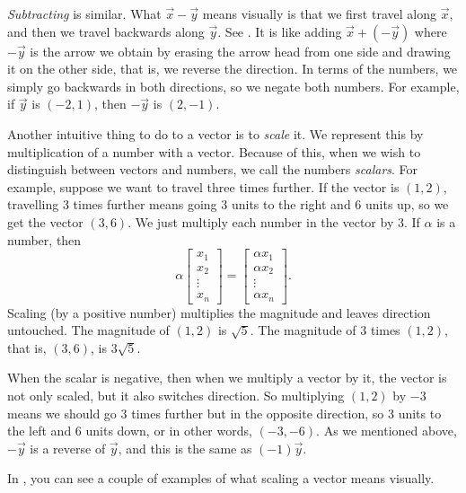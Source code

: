 \emph{Subtracting} is similar.
What $\vec{x}- \vec{y}$ means visually is that
we first travel along $\vec{x}$, and then we travel
backwards along $\vec{y}$.
See .
It is like adding
$\vec{x}+ (- \vec{y})$ where $-\vec{y}$
is the arrow we obtain by erasing the arrow head
from one side and drawing it on the other side, that is, we reverse the
direction.  In terms of the numbers, we simply go backwards in both directions,
so we negate both numbers.  For example, if $\vec{y}$ is $(-2,1)$,
then $-\vec{y}$ is $(2,-1)$.

Another intuitive thing to do to a vector is to
\emph{scale} it.
We represent this by multiplication of a number with a vector.
Because of this, when we wish to distinguish between vectors and numbers, we
call the numbers \emph{scalars}.
For example,
suppose we want to travel three times further.  If the vector is $(1,2)$,
travelling 3 times further means going 3 units to the right and 6 units up,
so we get the vector $(3,6)$.
We just multiply each number in the vector by 3.
If $\alpha$ is a number, then
\begin{equation*}
\alpha
\begin{bmatrix}
x_{1} \\ x_2 \\ \vdots \\ x_n
\end{bmatrix} =
\begin{bmatrix}
\alpha x_{1} \\ \alpha x_2 \\ \vdots \\ \alpha x_n
\end{bmatrix} .
\end{equation*}
Scaling (by a positive number) multiplies the magnitude
and leaves direction untouched.
The magnitude of $(1,2)$
is $\sqrt{5}$.  The magnitude of 3 times $(1,2)$, that is, $(3,6)$, is
$3\sqrt{5}$.

When the scalar is negative, then when we multiply a vector by it, the
vector is not only scaled, but it also switches direction.
So
multiplying $(1,2)$ by $-3$ means we should go 3 times further but in the
opposite direction, so 3 units to the left and 6 units down, or in other
words, $(-3,-6)$.  As we mentioned above, $-\vec{y}$ is a reverse of
$\vec{y}$, and this is the same as $(-1)\vec{y}$.

In , you can see a couple of examples of
what scaling a vector means visually.


